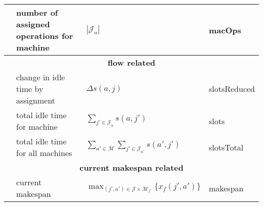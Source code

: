 \begin{tabular}{clll}
	\phimacOps       & number of assigned operations for machine & $|\mathcal{J}_a|$                                                                  & macOps       \\
	\midrule
	\multicolumn{4}{c}{\textbf{flow related}}\\
	\phislotsReduced & change in idle time by assignment         & $\Delta s(a,j)$                                                                    & slotsReduced \\
	\phislots        & total idle time for machine               & $\sum_{j'\in \mathcal{J}_a}s(a,j')$                                                & slots        \\
	\phislotsTotal   & total idle time for all machines          & $\sum_{a'\in \mathcal{M}}\sum_{j'\in \mathcal{J}_{a'}}s(a',j')$                    & slotsTotal   \\
	\midrule
	\multicolumn{4}{c}{\textbf{current makespan related}}\\
	\phimakespan     & current makespan                          & 
	$\max_{(j',a')\in \mathcal{J} \times 
	\mathcal{M}_{j'}}\{x_f(j',a')\}$              & makespan     \\
	\bottomrule
\end{tabular}

